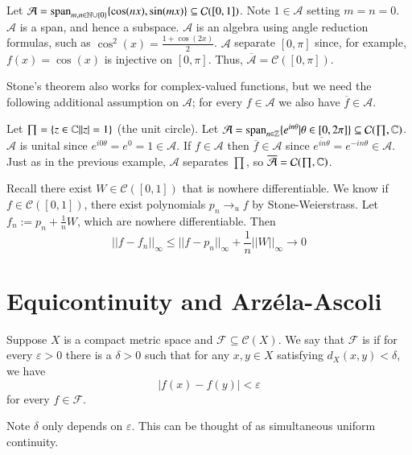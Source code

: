 \begin{eg}
    Let $\mathcal{A} = \text{span}_{m,n\in\mathbb N\cup\{0\}}\{\cos(nx),\sin(mx)\} \subseteq \mathcal{C}([0,1])$. Note $1 \in \mathcal{A}$ setting $m = n= 0$. $\mathcal{A}$ is a span, and hence a subspace. $\mathcal{A}$ is an algebra using angle reduction formulas, such as $\cos^2(x) = \frac{1+\cos(2x)}{2}$. $\mathcal{A}$ separate $[0,\pi]$ since, for example, $f(x) = \cos(x)$ is injective on $[0,\pi]$. Thus, $\overline{\mathcal{A}} = \mathcal{C}([0,\pi])$.
\end{eg}

Stone's theorem also works for complex-valued functions, but we need the following additional assumption on $\mathcal{A}$; for every $f \in \mathcal{A}$ we also have $\overline{f} \in \mathcal{A}$.

\begin{eg}
    Let $\prod = \{z \in \mathbb C\vert |z| = 1\}$ (the unit circle). Let $\mathcal{A} = \text{span}_{n\in\mathbb Z}\{e^{in\theta}\vert\theta \in [0,2\pi]\} \subseteq \mathcal{C}(\prod,\mathbb C)$. $\mathcal{A}$ is unital since $e^{i0\theta} = e^0 = 1 \in \mathcal{A}$. If $f \in \mathcal{A}$ then $\overline{f} \in \mathcal{A}$ since $\overline{e^{in\theta}} = e^{-in\theta} \in \mathcal{A}$. Just as in the previous example, $\mathcal{A}$ separates $\prod$, so $\overline{\mathcal{A}} = \mathcal{C}(\prod,\mathbb C)$.
\end{eg}

\begin{eg}
    Recall there exist $W \in \mathcal{C}([0,1])$ that is nowhere differentiable. We know if $f \in \mathcal{C}([0,1])$, there exist polynomials $p_n\rightarrow_uf$ by Stone-Weierstrass. Let $f_n := p_n + \frac{1}{n}W$, which are nowhere differentiable. Then $$||f-f_n||_{\infty} \leq ||f-p_n||_{\infty}+\frac{1}{n}||W||_{\infty}\rightarrow 0$$ 
\end{eg}



\section{Equicontinuity and Arz\'{e}la-Ascoli}

\begin{defn}[Equicontinuity]
    Suppose $X$ is a compact metric space and $\mathcal{F} \subseteq \mathcal{C}(X)$. We say that $\mathcal{F}$ is  if for every $\varepsilon > 0$ there is a $\delta > 0$ such that for any $x,y \in X$ satisfying $d_X(x,y) < \delta$, we have $$|f(x) - f(y)| < \varepsilon$$ for every $f \in \mathcal{F}$.
\end{defn}
Note $\delta $ only depends on $\varepsilon $. This can be thought of as simultaneous uniform continuity.

